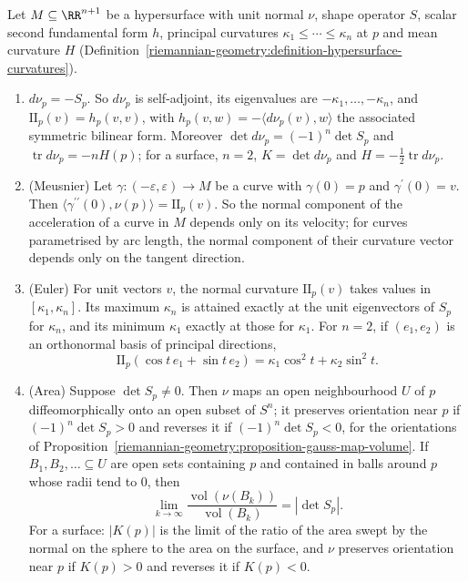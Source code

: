 \begin{proposition}\label{riemannian-geometry:proposition-gauss-map-curvatures}
Let $M \subseteq \RR^{n+1}$ be a hypersurface with unit normal $\nu$, shape operator $S$, scalar second fundamental form $h$, principal curvatures $\kappa_1 \leq \cdots \leq \kappa_n$ at $p$ and mean
curvature $H$ (Definition~\ref{riemannian-geometry:definition-hypersurface-curvatures}).
\begin{enumerate}
\item $d\nu_p = -S_p$. So $d\nu_p$ is self-adjoint, its eigenvalues are $-\kappa_1, \ldots, -\kappa_n$, and $\mathrm{II}_p(v) = h_p(v, v)$, with $h_p(v, w) = -\langle d\nu_p(v), w\rangle$ the associated symmetric
bilinear form. Moreover $\det d\nu_p = (-1)^n\det S_p$ and $\operatorname{tr}d\nu_p = -nH(p)$; for a surface, $n = 2$, $K = \det d\nu_p$ and $H = -\frac12\operatorname{tr}d\nu_p$.
\item (Meusnier) Let $\gamma \colon (-\varepsilon, \varepsilon) \to M$ be a curve with $\gamma(0) = p$ and $\gamma^{\prime}(0) = v$. Then $\langle\gamma^{\prime\prime}(0), \nu(p)\rangle = \mathrm{II}_p(v)$. So the normal component
of the acceleration of a curve in $M$ depends only on its velocity; for curves parametrised by arc length, the normal component of their curvature vector depends only on the tangent direction.
\item (Euler) For unit vectors $v$, the normal curvature $\mathrm{II}_p(v)$ takes values in $[\kappa_1, \kappa_n]$. Its maximum $\kappa_n$ is attained exactly at the unit eigenvectors of $S_p$ for $\kappa_n$,
and its minimum $\kappa_1$ exactly at those for $\kappa_1$. For $n = 2$, if $(e_1, e_2)$ is an orthonormal basis of principal directions,
\[
\mathrm{II}_p(\cos t\,e_1 + \sin t\,e_2) = \kappa_1\cos^2t + \kappa_2\sin^2t .
\]
\item (Area) Suppose $\det S_p \neq 0$. Then $\nu$ maps an open neighbourhood $U$ of $p$ diffeomorphically onto an open subset of $S^n$; it preserves orientation near $p$ if $(-1)^n\det S_p > 0$ and reverses
it if $(-1)^n\det S_p < 0$, for the orientations of Proposition~\ref{riemannian-geometry:proposition-gauss-map-volume}. If $B_1, B_2, \ldots \subseteq U$ are open sets containing $p$ and contained in balls
around $p$ whose radii tend to $0$, then
\[
\lim_{k \to \infty}\frac{\operatorname{vol}(\nu(B_k))}{\operatorname{vol}(B_k)} = |\det S_p| .
\]
For a surface: $|K(p)|$ is the limit of the ratio of the area swept by the normal on the sphere to the area on the surface, and $\nu$ preserves orientation near $p$ if $K(p) > 0$ and reverses it if $K(p) < 0$.
\end{enumerate}
\end{proposition}


